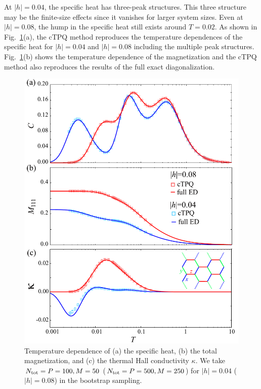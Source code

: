 \documentclass[reprint,amsmath,amssymb,aps,prx]{revtex4-2}
\begin{document}
At $|h|=0.04$, the specific heat has three-peak structures.
This three structure may be the finite-size effects 
since it vanishes for larger system sizes. %
Even at $|h|=0.08$, the hump in the specific heat 
still exists around $T=0.02$.
As shown in Fig.~\ref{comp_ED}(a),
the cTPQ method reproduces the temperature dependences 
of the specific heat for $|h|=0.04$ and $|h|=0.08$ including
the multiple peak structures.
Fig.~\ref{comp_ED}(b) shows 
the temperature dependence of the magnetization and
the cTPQ method also reproduces the results of the 
full exact diagonalization. 

\begin{figure}[t] 
\begin{center} 
\includegraphics[width=0.9\linewidth]{compED_4_o.pdf}
\vspace{-0.5cm} 
\caption{Temperature dependence of (a) the specific heat, (b) the total magnetization, and
(c) the thermal Hall conductivity $\kappa$.
We take $N_{\rm tot}=P=100,M=50$ ($N_{\rm tot}=P=500,M=250$) 
for $|h|=0.04$ ($|h|=0.08$)
in the bootstrap sampling.}
\label{comp_ED}
\end{center}
\end{figure}
\end{document}
